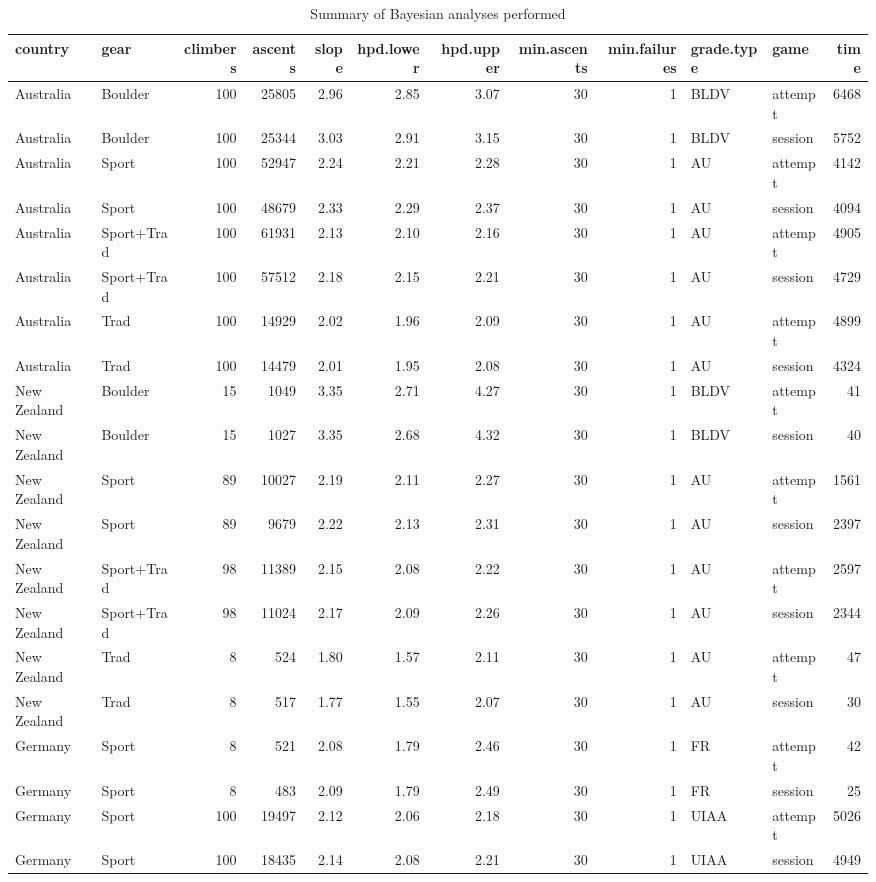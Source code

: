 \begin{table}[ht]
\centering
\begingroup\fontsize{9pt}{10pt}\selectfont
\begin{tabular}{llrrrrrrrllr}
  \hline
{\bf country} & {\bf gear} & {\bf climbers} & {\bf ascents} & {\bf slope} & {\bf hpd.lower} & {\bf hpd.upper} & {\bf min.ascents} & {\bf min.failures} & {\bf grade.type} & {\bf game} & {\bf time} \\ 
  \hline
Australia & Boulder & 100 & 25805 & 2.96 & 2.85 & 3.07 &  30 &   1 & BLDV & attempt & 6468 \\ 
  Australia & Boulder & 100 & 25344 & 3.03 & 2.91 & 3.15 &  30 &   1 & BLDV & session & 5752 \\ 
  Australia & Sport & 100 & 52947 & 2.24 & 2.21 & 2.28 &  30 &   1 & AU & attempt & 4142 \\ 
  Australia & Sport & 100 & 48679 & 2.33 & 2.29 & 2.37 &  30 &   1 & AU & session & 4094 \\ 
  Australia & Sport+Trad & 100 & 61931 & 2.13 & 2.10 & 2.16 &  30 &   1 & AU & attempt & 4905 \\ 
  Australia & Sport+Trad & 100 & 57512 & 2.18 & 2.15 & 2.21 &  30 &   1 & AU & session & 4729 \\ 
  Australia & Trad & 100 & 14929 & 2.02 & 1.96 & 2.09 &  30 &   1 & AU & attempt & 4899 \\ 
  Australia & Trad & 100 & 14479 & 2.01 & 1.95 & 2.08 &  30 &   1 & AU & session & 4324 \\ 
  New Zealand & Boulder &  15 & 1049 & 3.35 & 2.71 & 4.27 &  30 &   1 & BLDV & attempt &  41 \\ 
  New Zealand & Boulder &  15 & 1027 & 3.35 & 2.68 & 4.32 &  30 &   1 & BLDV & session &  40 \\ 
  New Zealand & Sport &  89 & 10027 & 2.19 & 2.11 & 2.27 &  30 &   1 & AU & attempt & 1561 \\ 
  New Zealand & Sport &  89 & 9679 & 2.22 & 2.13 & 2.31 &  30 &   1 & AU & session & 2397 \\ 
  New Zealand & Sport+Trad &  98 & 11389 & 2.15 & 2.08 & 2.22 &  30 &   1 & AU & attempt & 2597 \\ 
  New Zealand & Sport+Trad &  98 & 11024 & 2.17 & 2.09 & 2.26 &  30 &   1 & AU & session & 2344 \\ 
  New Zealand & Trad &   8 & 524 & 1.80 & 1.57 & 2.11 &  30 &   1 & AU & attempt &  47 \\ 
  New Zealand & Trad &   8 & 517 & 1.77 & 1.55 & 2.07 &  30 &   1 & AU & session &  30 \\ 
  Germany & Sport &   8 & 521 & 2.08 & 1.79 & 2.46 &  30 &   1 & FR & attempt &  42 \\ 
  Germany & Sport &   8 & 483 & 2.09 & 1.79 & 2.49 &  30 &   1 & FR & session &  25 \\ 
  Germany & Sport & 100 & 19497 & 2.12 & 2.06 & 2.18 &  30 &   1 & UIAA & attempt & 5026 \\ 
  Germany & Sport & 100 & 18435 & 2.14 & 2.08 & 2.21 &  30 &   1 & UIAA & session & 4949 \\ 
   \hline
\end{tabular}
\endgroup
\caption{Summary of Bayesian analyses performed} 
\end{table}
